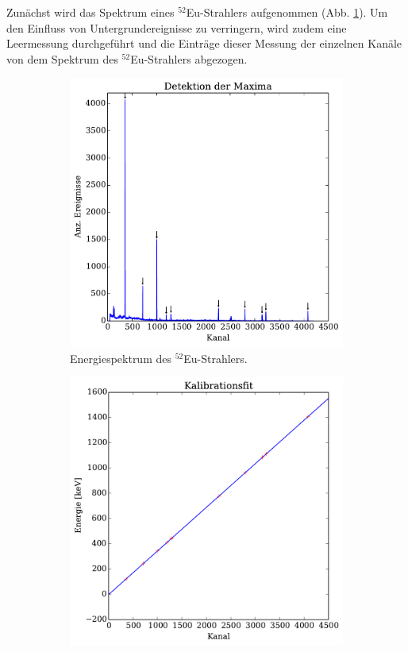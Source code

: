 Zunächst wird das Spektrum eines $^{52}$Eu-Strahlers aufgenommen (Abb. \ref{fig:eu_uncalibrated}).
Um den Einfluss von Untergrundereignisse zu verringern, wird zudem eine Leermessung durchgeführt und die Einträge dieser Messung der einzelnen Kanäle von dem Spektrum des $^{52}$Eu-Strahlers abgezogen.
\begin{figure}[htb]
    \centering
    \begin{subfigure}{.49\linewidth}
        \includegraphics[width=1.0\linewidth]{img/02_maxima.pdf}
        \caption{
            Energiespektrum des $^{52}$Eu-Strahlers.
        }
        \label{fig:eu_uncalibrated}
    \end{subfigure}%
    \begin{subfigure}{.49\linewidth}
        \includegraphics[width=1.0\linewidth]{img/03_calibration.pdf}

\end{subfigure}
\end{figure}
